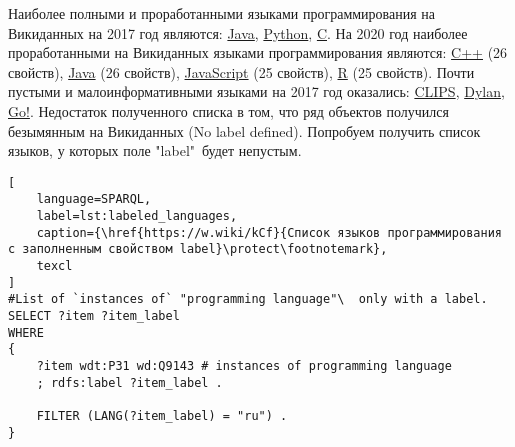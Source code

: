 Наиболее полными и проработанными языками программирования на Викиданных на 2017 год являются: \href{https://www.wikidata.org/wiki/Q251}{Java}, \href{https://www.wikidata.org/wiki/Q28865}{Python}, \href{https://www.wikidata.org/wiki/Q15777}{C}. На 2020 год наиболее проработанными на Викиданных языками программирования являются: \href{https://www.wikidata.org/wiki/Q2407}{C++} (26 свойств), \href{https://www.wikidata.org/wiki/Q251}{Java} (26 свойств), \href{https://www.wikidata.org/wiki/Q2005}{JavaScript} (25 свойств), \href{https://www.wikidata.org/wiki/Q206904}{R} (25 свойств).
Почти пустыми и малоинформативными языками на 2017 год оказались: \href{https://www.wikidata.org/wiki/Q165372}{CLIPS}, \href{https://www.wikidata.org/wiki/Q1268744}{Dylan}, \href{https://www.wikidata.org/wiki/Q3109515}{Go!}.
Недостаток полученного списка в том, что ряд объектов получился безымянным на Викиданных (No label defined). Попробуем получить список языков, у которых поле "label"\  будет непустым.

\label{question:prog_lang_1}

\begin{lstlisting}[
	language=SPARQL,
	label=lst:labeled_languages,
	caption={\href{https://w.wiki/kCf}{Список языков программирования с заполненным свойством label}\protect\footnotemark},
	texcl
]
#List of `instances of` "programming language"\  only with a label.
SELECT ?item ?item_label
WHERE
{
    ?item wdt:P31 wd:Q9143 # instances of programming language
    ; rdfs:label ?item_label . 

    FILTER (LANG(?item_label) = "ru") . 
}
\end{lstlisting}


